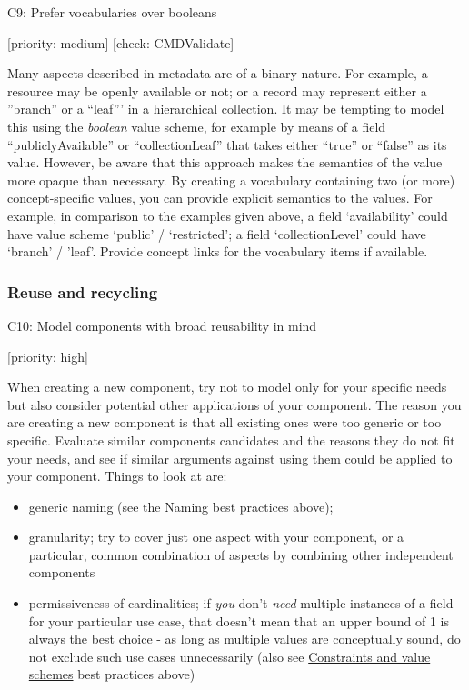 \documentclass[]{article}
\providecommand{\tightlist}{%
  \setlength{\itemsep}{0pt}\setlength{\parskip}{0pt}}
\begin{document}
C9: Prefer vocabularies over booleans

{[}priority: medium{]} {[}check: CMDValidate{]}

Many aspects described in metadata are of a binary nature. For example,
a resource may be openly available or not; or a record may represent
either a ''branch'' or a ``leaf''' in a hierarchical collection. It may
be tempting to model this using the \emph{boolean} value scheme, for
example by means of a field ``publiclyAvailable'' or ``collectionLeaf''
that takes either ``true'' or ``false'' as its value. However, be aware
that this approach makes the semantics of the value more opaque than
necessary. By creating a vocabulary containing two (or more)
concept-specific values, you can provide explicit semantics to the
values. For example, in comparison to the examples given above, a field
`availability' could have value scheme `public' / `restricted'; a field
`collectionLevel' could have `branch' / 'leaf'. Provide concept links
for the vocabulary items if available.

\subsubsection{Reuse and recycling}\label{reuse-and-recycling}

C10: Model components with broad reusability in mind

{[}priority: high{]}

When creating a new component, try not to model only for your specific
needs but also consider potential other applications of your component.
The reason you are creating a new component is that all existing ones
were too generic or too specific. Evaluate similar components candidates
and the reasons they do not fit your needs, and see if similar arguments
against using them could be applied to your component. Things to look at
are:

\begin{itemize}
\tightlist
\item
  generic naming (see the Naming best practices above);
\item
  granularity; try to cover just one aspect with your component, or a
  particular, common combination of aspects by combining other
  independent components
\item
  permissiveness of cardinalities; if \emph{you} don't \emph{need}
  multiple instances of a field for your particular use case, that
  doesn't mean that an upper bound of 1 is always the best choice - as
  long as multiple values are conceptually sound, do not exclude such
  use cases unnecessarily (also see
  \protect\hyperlink{constraints-and-value-schemes}{Constraints and
  value schemes} best practices above)
\end{itemize}
\end{document}
